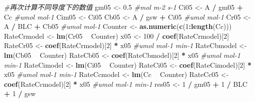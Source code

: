 \documentclass[
]{krantz}
\makeatletter
\newenvironment{Shaded}{\begin{snugshade}}{\end{snugshade}}
\newcommand{\CommentTok}[1]{\textcolor[rgb]{0.56,0.35,0.01}{\textit{#1}}}
\newcommand{\DecValTok}[1]{\textcolor[rgb]{0.00,0.00,0.81}{#1}}
\newcommand{\FloatTok}[1]{\textcolor[rgb]{0.00,0.00,0.81}{#1}}
\newcommand{\KeywordTok}[1]{\textcolor[rgb]{0.13,0.29,0.53}{\textbf{#1}}}
\newcommand{\NormalTok}[1]{#1}
\newcommand{\OperatorTok}[1]{\textcolor[rgb]{0.81,0.36,0.00}{\textbf{#1}}}
\newcommand{\StringTok}[1]{\textcolor[rgb]{0.31,0.60,0.02}{#1}}
\newenvironment{kframe}{%
\medskip{}
\setlength{\fboxsep}{.8em}
 \def\at@end@of@kframe{}%
 \ifinner\ifhmode%
  \def\at@end@of@kframe{\end{minipage}}%
  \begin{minipage}{\columnwidth}%
 \fi\fi%
 \def\FrameCommand##1{\hskip\@totalleftmargin \hskip-\fboxsep
 \colorbox{shadecolor}{##1}\hskip-\fboxsep
     \hskip-\linewidth \hskip-\@totalleftmargin \hskip\columnwidth}%
 \MakeFramed {\advance\hsize-\width
   \@totalleftmargin\z@ \linewidth\hsize
   \@setminipage}}%
 {\par\unskip\endMakeFramed%
 \at@end@of@kframe}
\renewenvironment{Shaded}{\begin{kframe}}{\end{kframe}}
\makeatother
\begin{document}
\begin{Shaded}
\begin{Highlighting}[]
\CommentTok{#再次计算不同导度下的数值}
\NormalTok{gm05 <-}\StringTok{ }\FloatTok{0.5} \CommentTok{#mol m-2 s-1}
\NormalTok{Ci05 <-}\StringTok{ }\NormalTok{A }\OperatorTok{/}\StringTok{ }\NormalTok{gm05 }\OperatorTok{+}\StringTok{ }\NormalTok{Cc }\CommentTok{#umol mol-1}
\NormalTok{Cim05 <-}\StringTok{ }\NormalTok{Ci05}
\NormalTok{Cb05 <-}\StringTok{ }\NormalTok{A }\OperatorTok{/}\StringTok{ }\NormalTok{gsw }\OperatorTok{+}\StringTok{ }\NormalTok{Ci05 }\CommentTok{#umol mol-1}
\NormalTok{Cr05 <-}\StringTok{ }\NormalTok{A }\OperatorTok{/}\StringTok{ }\NormalTok{BLC }\OperatorTok{+}\StringTok{ }\NormalTok{Cb05 }\CommentTok{#umol mol-1}
\NormalTok{Counter <-}\StringTok{ }\KeywordTok{as.numeric}\NormalTok{(}\KeywordTok{c}\NormalTok{(}\DecValTok{1}\OperatorTok{:}\KeywordTok{length}\NormalTok{(Cc)))}
\NormalTok{RateCrmodel <-}\StringTok{ }\KeywordTok{lm}\NormalTok{(Cr05 }\OperatorTok{~}\StringTok{ }\NormalTok{Counter)}
\NormalTok{x05 <-}\StringTok{ }\DecValTok{100} \OperatorTok{/}\StringTok{ }\KeywordTok{coef}\NormalTok{(RateCrmodel)[}\DecValTok{2}\NormalTok{]}
\NormalTok{RateCr05 <-}\StringTok{ }\KeywordTok{coef}\NormalTok{(RateCrmodel)[}\DecValTok{2}\NormalTok{] }\OperatorTok{*}\StringTok{ }\NormalTok{x05 }\CommentTok{#umol mol-1 min-1}
\NormalTok{RateCbmodel <-}\StringTok{ }\KeywordTok{lm}\NormalTok{(Cb05 }\OperatorTok{~}\StringTok{ }\NormalTok{Counter)}
\NormalTok{RateCb05 <-}\StringTok{ }\KeywordTok{coef}\NormalTok{(RateCbmodel)[}\DecValTok{2}\NormalTok{] }\OperatorTok{*}\StringTok{ }\NormalTok{x05 }\CommentTok{#umol mol-1 min-1}
\NormalTok{RateCimodel <-}\StringTok{ }\KeywordTok{lm}\NormalTok{(Ci05 }\OperatorTok{~}\StringTok{ }\NormalTok{Counter)}
\NormalTok{RateCi05 <-}\StringTok{ }\KeywordTok{coef}\NormalTok{(RateCimodel)[}\DecValTok{2}\NormalTok{] }\OperatorTok{*}\StringTok{ }\NormalTok{x05 }\CommentTok{#umol mol-1 min-1}
\NormalTok{RateCcmodel <-}\StringTok{ }\KeywordTok{lm}\NormalTok{(Cc }\OperatorTok{~}\StringTok{ }\NormalTok{Counter)}
\NormalTok{RateCc05 <-}\StringTok{ }\KeywordTok{coef}\NormalTok{(RateCcmodel)[}\DecValTok{2}\NormalTok{] }\OperatorTok{*}\StringTok{ }\NormalTok{x05 }\CommentTok{#umol mol-1 min-1}
\NormalTok{res05 <-}\StringTok{ }\DecValTok{1} \OperatorTok{/}\StringTok{ }\NormalTok{gm05 }\OperatorTok{+}\StringTok{ }\DecValTok{1} \OperatorTok{/}\StringTok{ }\NormalTok{BLC }\OperatorTok{+}\StringTok{ }\DecValTok{1} \OperatorTok{/}\StringTok{ }\NormalTok{gsw}


\end{Highlighting}
\end{Shaded}
\end{document}
